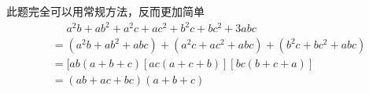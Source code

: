 \documentclass[windows,csize4,answers]{BHCexam}
\begin{document}
\begin{groups}
\begin{questions}[]
\begin{solution}{0.5cm}
            \method 此题完全可以用常规方法，反而更加简单
            \[
                \begin{aligned}
                    & \phantom{=} a^2b+ab^2+a^2c+ac^2+b^2c+bc^2+3abc \\
                    &= (a^2b+ab^2 +abc) +(a^2c+ac^2+abc)+(b^2c+bc^2+abc) \\
                    &= [ab(a+b+c)[ac(a+c+b)][bc(b+c+a)] \\
                    &= (ab+ac+bc)(a+b+c)
                \end{aligned}
            \]

        \end{solution}

    \end{questions}
\end{groups}



\label{lastpage}
\end{document}
